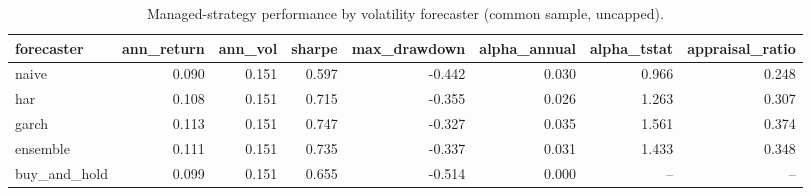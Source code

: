 \begin{table}[htbp]
\centering
\caption{Managed-strategy performance by volatility forecaster (common sample, uncapped).}
\label{tab:forecasters}
\small
\begin{tabular}{lrrrrrrr}
\toprule
forecaster & ann\_return & ann\_vol & sharpe & max\_drawdown & alpha\_annual & alpha\_tstat & appraisal\_ratio \\
\midrule
naive & 0.090 & 0.151 & 0.597 & -0.442 & 0.030 & 0.966 & 0.248 \\
har & 0.108 & 0.151 & 0.715 & -0.355 & 0.026 & 1.263 & 0.307 \\
garch & 0.113 & 0.151 & 0.747 & -0.327 & 0.035 & 1.561 & 0.374 \\
ensemble & 0.111 & 0.151 & 0.735 & -0.337 & 0.031 & 1.433 & 0.348 \\
buy\_and\_hold & 0.099 & 0.151 & 0.655 & -0.514 & 0.000 & -- & -- \\
\bottomrule
\end{tabular}
\end{table}
